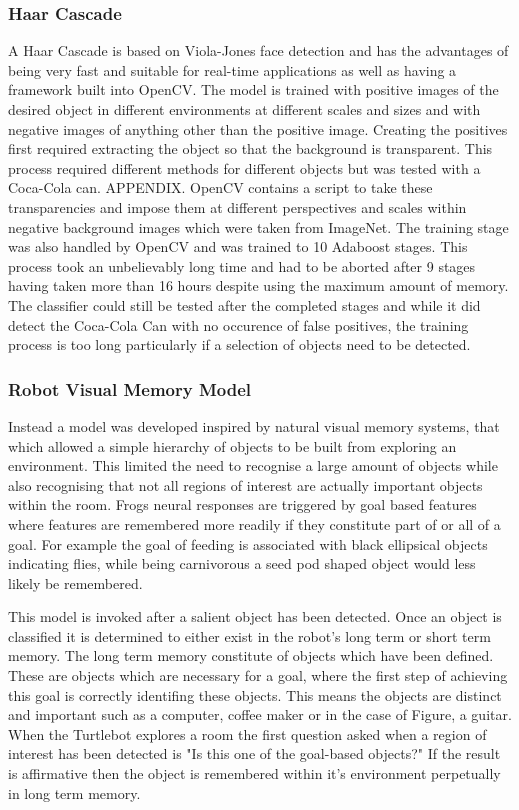 \documentclass{mproj}
\begin{document}
\subsubsection{Haar Cascade}

A Haar Cascade is based on Viola-Jones face detection and has the advantages of being very fast and suitable for real-time applications\cite{viola} as well as having a framework built into OpenCV. The model is trained with positive images of the desired object in different environments at different scales and sizes and with negative images of anything other than the positive image. Creating the positives first required extracting the object so that the background is transparent. This process required different methods for different objects but was tested with a Coca-Cola can. APPENDIX. OpenCV contains a script to take these transparencies and impose them at different perspectives and scales within negative background images which were taken from ImageNet\cite{}. The training stage was also handled by OpenCV and was trained to 10 Adaboost stages. This process took an unbelievably long time and had to be aborted after 9 stages having taken more than 16 hours despite using the maximum amount of memory. The classifier could still be tested after the completed stages and while it did detect the Coca-Cola Can with no occurence of false positives, the training process is too long particularly if a selection of objects need to be detected.    

\subsubsection{Robot Visual Memory Model}

Instead a model was developed inspired by natural visual memory systems, that which allowed a simple hierarchy of objects to be built from exploring an environment. This limited the need to recognise a large amount of objects while also recognising that not all regions of interest are actually important objects within the room. Frogs neural responses are triggered by goal based features where features are remembered more readily if they constitute part of or all of a goal. For example the goal of feeding is associated with black ellipsical objects indicating flies, while being carnivorous a seed pod shaped object would less likely be remembered.

This model is invoked after a salient object has been detected. Once an object is classified it is determined to either exist in the robot's long term or short term memory. The long term memory constitute of objects which have been defined. These are objects which are necessary for a goal, where the first step of achieving this goal is correctly identifing these objects. This means the objects are distinct and important such as a computer, coffee maker or in the case of Figure, a guitar. When the Turtlebot explores a room the first question asked when a region of interest has been detected is "Is this one of the goal-based objects?" If the result is affirmative then the object is remembered within it's environment perpetually in long term memory. 
\end{document}

